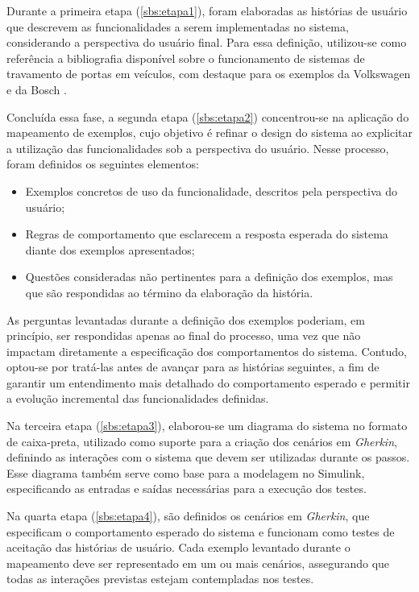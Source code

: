Durante a primeira etapa (\ref{sbs:etapa1}), foram elaboradas as histórias de usuário que descrevem as funcionalidades a serem implementadas no sistema, considerando 
a perspectiva do usuário final. Para essa definição, utilizou-se como referência a bibliografia disponível sobre o funcionamento de sistemas de travamento de portas 
em veículos, com destaque para os exemplos da Volkswagen \cite{vwLocking} e da Bosch \cite{bosch2022handbook,reif2017locking}.

Concluída essa fase, a segunda etapa (\ref{sbs:etapa2}) concentrou-se na aplicação do mapeamento de exemplos, cujo objetivo é refinar o design do sistema ao explicitar 
a utilização das funcionalidades sob a perspectiva do usuário. Nesse processo, foram definidos os seguintes elementos:

\begin{itemize}
    \item Exemplos concretos de uso da funcionalidade, descritos pela perspectiva do usuário;
    \item Regras de comportamento que esclarecem a resposta esperada do sistema diante dos exemplos apresentados;
    \item Questões consideradas não pertinentes para a definição dos exemplos, mas que são respondidas ao término da elaboração da história.
\end{itemize}

As perguntas levantadas durante a definição dos exemplos poderiam, em princípio, ser respondidas apenas ao final do processo, uma vez que não impactam diretamente a 
especificação dos comportamentos do sistema. Contudo, optou-se por tratá-las antes de avançar para as histórias seguintes, a fim de garantir um entendimento mais 
detalhado do comportamento esperado e permitir a evolução incremental das funcionalidades definidas.

Na terceira etapa (\ref{sbs:etapa3}), elaborou-se um diagrama do sistema no formato de caixa-preta, utilizado como suporte para a criação dos cenários em \textit{Gherkin}, 
definindo as interações com o sistema que devem ser utilizadas durante os passos. Esse diagrama também serve como base para a modelagem no Simulink, especificando as 
entradas e saídas necessárias para a execução dos testes.

Na quarta etapa (\ref{sbs:etapa4}), são definidos os cenários em \textit{Gherkin}, que especificam o comportamento esperado do sistema e funcionam como testes de 
aceitação das histórias de usuário. Cada exemplo levantado durante o mapeamento deve ser representado em um ou mais cenários, assegurando que todas as interações 
previstas estejam contempladas nos testes.

